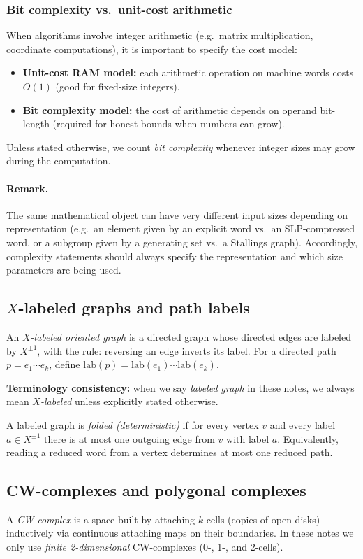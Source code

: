 \documentclass[11pt]{article}
\theoremstyle{definition}
\theoremstyle{plain}
\theoremstyle{remark}
\newcommand{\lab}{\mathrm{lab}}
\begin{document}
\subsubsection*{Bit complexity vs.\ unit-cost arithmetic}
When algorithms involve integer arithmetic (e.g.\ matrix multiplication, coordinate computations),
it is important to specify the cost model:
\begin{itemize}[leftmargin=2em]
\item \textbf{Unit-cost RAM model:} each arithmetic operation on machine words costs $O(1)$ (good for fixed-size integers).
\item \textbf{Bit complexity model:} the cost of arithmetic depends on operand bit-length (required for honest bounds when numbers can grow).
\end{itemize}
Unless stated otherwise, we count \emph{bit complexity} whenever integer sizes may grow during the computation.

\paragraph{Remark.}
The same mathematical object can have very different input sizes depending on representation
(e.g.\ an element given by an explicit word vs.\ an SLP-compressed word, or a subgroup given by a generating set vs.\ a Stallings graph).
Accordingly, complexity statements should always specify the representation and which size parameters are being used.



\subsection{$X$-labeled graphs and path labels}
An \emph{$X$-labeled oriented graph} is a directed graph whose directed edges are labeled by $X^{\pm1}$, with the rule:
reversing an edge inverts its label.
For a directed path $p=e_1\cdots e_k$, define $\lab(p)=\lab(e_1)\cdots\lab(e_k)$.

\textbf{Terminology consistency:} when we say \emph{labeled graph} in these notes, we always mean \emph{$X$-labeled} unless explicitly stated otherwise.

A labeled graph is \emph{folded (deterministic)} if for every vertex $v$ and every label $a\in X^{\pm1}$ there is at most one outgoing edge from $v$ with label $a$.
Equivalently, reading a reduced word from a vertex determines at most one reduced path.

\subsection{CW-complexes and polygonal complexes}
A \emph{CW-complex} is a space built by attaching $k$-cells (copies of open disks) inductively via continuous attaching maps on their boundaries.
In these notes we only use \emph{finite 2-dimensional} CW-complexes (0-, 1-, and 2-cells).\cite{hatcher2002}
\end{document}
